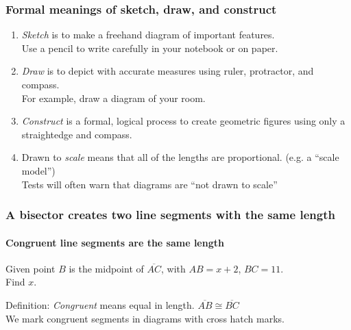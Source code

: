\documentclass{beamer}
\begin{document}
  \frame
  {
    \frametitle{Formal meanings of sketch, draw, and construct}
    \begin{enumerate}
      \item \emph{Sketch} is to make a freehand diagram of important features. \\[0.15cm]
      Use a pencil to write carefully in your notebook or on paper.  \smallskip
      \item \emph{Draw}  is to depict with accurate measures using ruler, protractor, and compass.\\[0.15cm]
      For example, draw a diagram of your room. \smallskip
      \item \emph{Construct} is a formal, logical process to create geometric figures using only a straightedge and compass. \smallskip
      \item Drawn to \emph{scale} means that all of the lengths are proportional. (e.g. a ``scale model'')\\[0.15cm]
      Tests will often warn that diagrams are ``not drawn to scale''
    \end{enumerate}
  }

  \frame
  {
    \frametitle{A bisector creates two line segments with the same length}
    \framesubtitle{Congruent line segments are the same length}
    Given point $B$ is the midpoint of $\overline{AC}$, with $AB=x+2$, $BC=11$. \\
    Find $x$.
      \begin{center}
      \end{center} \vspace{2cm}
      Definition:  \emph{Congruent} means equal in length. $\overline{AB} \cong \overline{BC}$\\
      We mark congruent segments in diagrams with cross hatch marks.
  }
\end{document}
